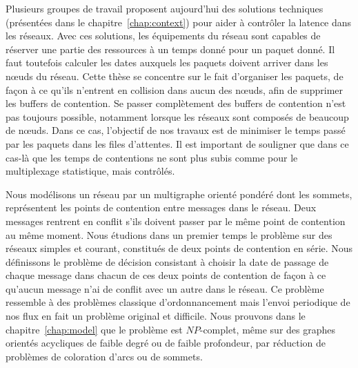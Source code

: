 Plusieurs groupes de travail proposent aujourd'hui des solutions techniques (présentées dans le chapitre~\ref{chap:context}) pour aider à contrôler la latence dans les réseaux. Avec ces solutions, les équipements du réseau sont capables de réserver une partie des ressources à un temps donné pour un paquet donné. Il faut toutefois calculer les dates auxquels les paquets doivent arriver dans les nœuds du réseau. Cette thèse se concentre sur le fait d'organiser les paquets, de façon à ce qu'ils n'entrent en collision dans aucun des nœuds, afin de supprimer les buffers de contention. Se passer complètement des buffers de contention n'est pas toujours possible, notamment lorsque les réseaux sont composés de beaucoup de nœuds. Dans ce cas, l'objectif de nos travaux est de minimiser le temps passé par les paquets dans les files d'attentes. Il est important de souligner que dans ce cas-là que les temps de contentions ne sont plus subis comme pour le multiplexage statistique, mais contrôlés.

Nous modélisons un réseau par un multigraphe orienté pondéré dont les sommets, représentent les points de contention entre messages dans le réseau. Deux messages rentrent en conflit s’ils doivent passer par le même point de contention au même moment. Nous étudions dans un premier temps le problème sur des réseaux simples et courant, constitués de deux points de contention en série. Nous définissons le problème de décision consistant à choisir la date de passage de chaque message dans chacun de ces deux points de contention de façon à ce qu'aucun message n'ai de conflit avec un autre dans le réseau. Ce problème ressemble à des problèmes classique d'ordonnancement mais l'envoi periodique de nos flux en fait un problème original et difficile. Nous prouvons dans le chapitre~\ref{chap:model} que le problème est $NP$-complet, même sur des graphes orientés acycliques de faible degré ou de faible profondeur, par réduction de problèmes de coloration d'arcs ou de sommets.


